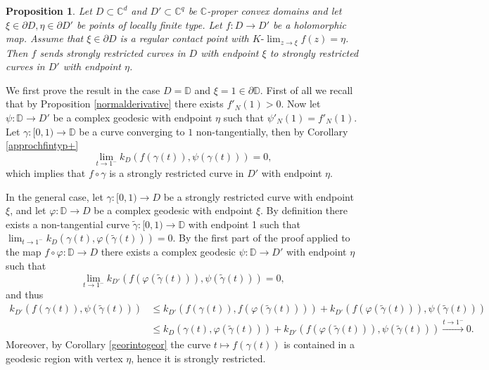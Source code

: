 \documentclass[11pt, reqno]{amsart}
\numberwithin{equation}{section}
\newtheorem{proposition}[theorem]{Proposition}
\theoremstyle{definition}
\newcommand{\C}{\mathbb{C}}
\newcommand{\D}{\mathbb{D}}
\begin{document}
{{{		
		\begin{proposition}\label{fphisigmac}
			Let $D\subset\C^d$ and $D'\subset\C^{q}$ be  $\C$-proper convex domains and  let $\xi\in \partial D,\eta\in \partial D' $ be  points of locally finite type. Let $f\colon D\to D'$ be a holomorphic map. 
			Assume that $\xi\in\partial D$ is a regular contact point with $K\textrm{-}\lim_{z\to\xi}f(z)=\eta$.
			Then $f$ sends strongly restricted curves in $D$ with endpoint $\xi$ to strongly restricted curves in $D'$ with endpoint $\eta$.
		\end{proposition}
		\proof  We first prove the result in the case $D=\D$ and $\xi=1\in\partial\D$. 
		First of all we recall that by Proposition \ref{normalderivative} there exists $f'_N(1)>0$.
		Now let $\psi\colon\D\to D'$ be a complex geodesic with endpoint $\eta$ such that   $\psi'_N(1)=f'_N(1)$. 
		Let $\gamma\colon[0,1)\to\D$ be a curve converging to $1$ non-tangentially, then by Corollary \ref{approchfintyp+}
		$$\lim_{t\to1^-}k_D(f(\gamma(t)),\psi(\gamma(t)))=0,$$
		which implies that $f\circ\gamma$ is a strongly restricted curve in $D'$ with endpoint $\eta$.
		
		In the general case, let $\gamma\colon[0,1)\to D$ be a strongly restricted curve with endpoint $\xi$, and let  $\varphi\colon \D\to D$ be a complex geodesic with endpoint $\xi$. By definition there exists  a  non-tangential curve $\tilde\gamma\colon[0,1)\to\D$ with endpoint 1 such that
		$\lim_{t\to1^-}k_D(\gamma(t),\varphi(\tilde\gamma(t)))=0.$
		By the first part of the proof applied to the map $f\circ \varphi\colon\D\to D$ there exists a complex geodesic $\psi\colon \D\to D'$ with endpoint $\eta$ such that 
		$$\lim_{t\to1^-}k_{D'}(f(\varphi(\tilde\gamma(t))),\psi(\tilde\gamma(t)))=0,$$
		and thus
		\begin{align*}k_{D'}(f(\gamma(t)),\psi(\tilde\gamma(t)))&\leq k_{D'}(f(\gamma(t)),f(\varphi(\tilde\gamma(t))))+
			k_{D'}(f(\varphi(\tilde\gamma(t))),\psi(\tilde\gamma(t)))\\&\leq k_{D}(\gamma(t),\varphi(\tilde\gamma(t)))+
			k_{D'}(f(\varphi(\tilde\gamma(t))),\psi(\tilde\gamma(t)))\stackrel{t\to 1^-}\longrightarrow 0.\end{align*}
		Moreover, by  Corollary \ref{georintogeor} the curve $t\mapsto f(\gamma(t))$ is contained in a geodesic region with vertex $\eta$, hence it is strongly restricted.
		\endproof
		
		
		
}}}
\end{document}
